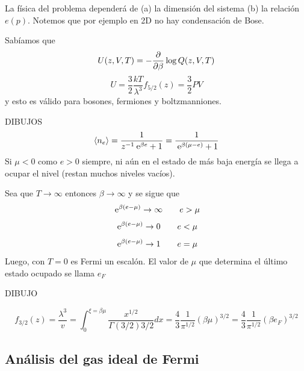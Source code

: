 \documentclass[10pt,oneside]{CBFT_book}
\begin{document}
La física del problema dependerá de (a) la dimensión del sistema (b) la relación $e(p)$. Notemos que por ejemplo
en 2D no hay condensación de Bose.

Sabíamos que 
\[
	U(z,V,T) = - \frac{\partial^{\hspace{-0.05em}} {}}{\partial {\beta}^{\hspace{-0.05em}}}\log Q(z,V,T)
\]
\[
	U = \frac{3}{2} \frac{kT}{\lambda^3} f_{5/2}(z) = \frac{3}{2} PV
\]
y esto es válido para bosones, fermiones y boltzmanniones.


DIBUJOS
\[
	\braket{n_e} = \frac{1}{z^{-1} \:\mathrm{e}^{\beta e} + 1 } = \frac{1}{ \:\mathrm{e}^{\beta ( \mu - e) } + 1 }
\]
Si $ \mu < 0 $ como $ e > 0 $ siempre, ni aún en el estado de más baja energía se llega a ocupar el
nivel (restan muchos niveles vacíos).

Sea que $ T \to \infty $ entonces $ \beta \to \infty $ y se sigue que 
\[
	\:\mathrm{e}^{\beta(e-\mu)} \to \infty \qquad e> \mu
\]
\[
	\:\mathrm{e}^{\beta(e-\mu)} \to 0 \qquad  e< \mu
\]
\[
	\:\mathrm{e}^{\beta(e-\mu)} \to 1 \qquad  e = \mu
\]
Luego, con $ T = 0 $ es Fermi un escalón. El valor de $ \mu $ que determina el último
estado ocupado se llama $ e_F$ 

DIBUJO

\[
	f_{3/2}(z) = \frac{\lambda^3}{v} = \int_0^{\xi = \beta\mu } \frac{x^{1/2}}{\Gamma(3/2)3/2}dx =
	\frac{4}{3} \frac{1}{\pi^{1/2}} ( \beta\mu )^{3/2} = 
	\frac{4}{3} \frac{1}{\pi^{1/2}} ( \beta e_F )^{3/2}
\]


\subsection{Análisis del gas ideal de Fermi}
\end{document}
